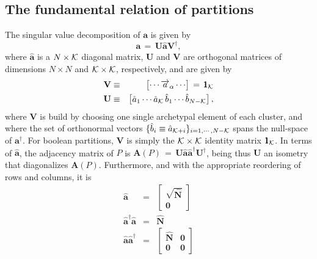 \documentclass[twocolumn,aps,sort,nofootinbib]{revtex4}
\begin{document}
\subsection{The fundamental relation of partitions}
The singular value decomposition of $\mathbf{a}$ is given by
\begin{equation}
\mathbf{a}\,=\,\mathbf{U}\mathbf{\hat{a}}\mathbf{V}^\dagger,
\label{SVDofa}
\end{equation}
where $\mathbf{\hat{a}}$ is a $N\times\cal{K}$ diagonal matrix, 
$\mathbf{U}$ and $\mathbf{V}$ are orthogonal matrices of dimensions $N\times N$ 
and $\cal{K}\times\cal{K}$, respectively, and are given by
\begin{eqnarray}
\mathbf{V} & \equiv & \begin{bmatrix}\cdots \overrightarrow{a}_\alpha \cdots\end{bmatrix} \,=\,\pmb{1}_{{\cal K}}\\
\mathbf{U} & \equiv & 
\begin{bmatrix} \hat{a}_1 \cdots \hat{a}_{\cal K}\,\hat{b}_{1}\cdots \hat{b}_{N-{\cal K}}
\end{bmatrix},\label{U-definition}
\end{eqnarray}
where $\mathbf{V}$ is build by choosing one single archetypal element of each cluster, and
where the set of orthonormal vectors $\{\hat{b}_i\equiv\hat{a}_{{\cal K}+i}\}_{i=1,\cdots ,{N-{\cal K}}}$ 
spans the null-space of $\mathbf{a}^\dagger$. 
For boolean partitions,
$\mathbf{V}$ is simply the $\cal{K}\times\cal{K}$ identity matrix 
$\pmb{1}_{\cal K}$. 
In terms of $\mathbf{\hat{a}}$, the adjacency matrix of $P$ is
$\mathbf{A}(P)\,=\,\mathbf{U}\mathbf{\hat{a}}\mathbf{\hat{a}}^\dagger\mathbf{U}^\dagger$, 
being thus $\mathbf{U}$ an isometry that diagonalizes $\mathbf{A}(P)$.
Furthermore, and with the appropriate reordering of rows and columns, it is
\begin{subequations}
\label{a-hat-relations-old}
\begin{eqnarray}
\mathbf{\hat{a}} & = & \begin{bmatrix}
\sqrt{\mathbf{\hat{N}}} \\ 
\mathbf{0}
\end{bmatrix} \label{a-hat_old}\\
\mathbf{\hat{a}}^\dagger\mathbf{\hat{a}} & = & \mathbf{\hat{N}} \label{a-hatT_a-hat_old}\\
\mathbf{\hat{a}}\mathbf{\hat{a}}^\dagger & = & 
\begin{bmatrix} 
\mathbf{\hat{N}} & \mathbf{0} \\
\mathbf{0} & \mathbf{0}
\end{bmatrix} \label{a-hat_a-hatT_old}
\end{eqnarray}
\end{subequations}
\end{document}
